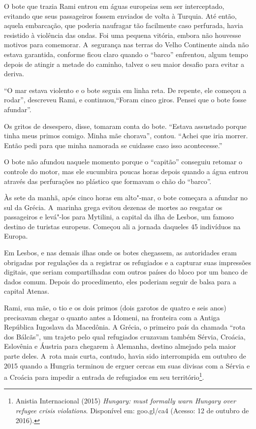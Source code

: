 O bote que trazia Rami entrou em águas europeias sem ser interceptado,
evitando que seus passageiros fossem enviados de volta à Turquia. Até
então, aquela embarcação, que poderia naufragar tão facilmente caso
perfurada, havia resistido à violência das ondas. Foi uma pequena
vitória, embora não houvesse motivos para comemorar. A~segurança nas
terras do Velho Continente ainda não estava garantida, conforme ficou
claro quando o ``barco'' enfrentou, algum tempo depois de atingir a
metade do caminho, talvez o seu maior desafio para evitar a deriva.

``O mar estava violento e o bote seguia em linha reta. De repente, ele
começou a rodar'', descreveu Rami, e continuou,``Foram cinco giros. Pensei que o
bote fosse afundar''.

Os gritos de desespero, disse, tomaram conta do bote. ``Estava assustado
porque tinha meus primos comigo. Minha mãe chorava'', contou.
``Achei que iria morrer. Então pedi para que minha namorada se cuidasse
caso isso acontecesse.''

O bote não afundou naquele momento porque o ``capitão'' conseguiu
retomar o controle do motor, mas ele sucumbira poucas horas depois
quando a água entrou através das perfurações no plástico que
formavam o chão do ``barco''.

Às sete da manhã, após cinco horas em alto"-mar, o bote começara a
afundar no sul da Grécia. A~marinha grega evitou dezenas de mortes ao
resgatar os passageiros e levá"-los para Mytilini, a capital da ilha de
Lesbos, um famoso destino de turistas europeus. Começou ali a jornada
daqueles 45 indivíduos na Europa.

Em Lesbos, e nas demais ilhas onde os botes chegassem, as autoridades
eram obrigadas por regulações da  a registrar os refugiados e a
capturar suas impressões digitais, que seriam compartilhadas com outros
países do bloco por um banco de dados comum. Depois do procedimento,
eles poderiam seguir de balsa para a capital Atenas.

Rami, sua mãe, o tio e os dois primos (dois garotos de quatro e seis
anos) precisavam chegar o quanto antes a Idomeni, na fronteira com a Antiga República Iugoslava da Macedônia.
% 
% 
A Grécia, o primeiro país da chamada ``rota dos Bálcãs'', um trajeto pelo qual
refugiados cruzavam também Sérvia, Croácia, Eslovênia e Áustria para
chegarem à Alemanha, destino almejado pela maior parte deles. A~rota
mais curta, contudo, havia sido interrompida em outubro de 2015 quando a
Hungria terminou de erguer cercas em suas divisas com a Sérvia e a
Croácia para impedir a entrada de refugiados em seu
território\footnote{ Anistia Internacional (2015) \emph{Hungary:  must
formally warn Hungary over refugee crisis violations}. Disponível em:
goo.gl/ca4
(Acesso: 12 de outubro de 2016).}.

